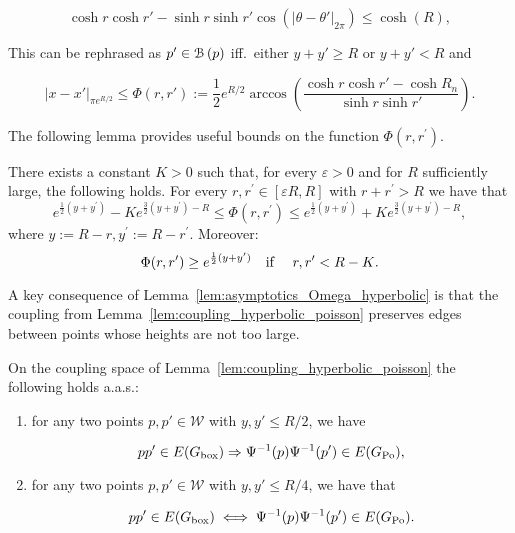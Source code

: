 $$
	\cosh r \cosh r' - \sinh r \sinh r'\cos\left( |\theta-\theta'|_{2\pi} \right) \le \cosh(R),
$$

\noindent
This can be rephrased as $p'\in {\mathcal B}\left(p\right)$ iff.~either $y+y'\geq R$ or $y+y'<R$ and 


\begin{equation}\label{eq:def_Omega_hyperbolic}
	|x-x'|_{\pi e^{R/2}} \leq \Phi(r,r') := \frac{1}{2}e^{R/2} \arccos\left( \frac{\cosh r \cosh r' - \cosh R_n}
	{\sinh r \sinh r'} \right).
\end{equation}

The following lemma provides useful bounds on the function $\Phi(r,r^\prime)$.

\begin{lemma}\label{lem:asymptotics_Omega_hyperbolic}
There exists a constant $K>0$ such that, for every $\varepsilon > 0$ and for $R$ sufficiently large, the following holds.
For every $r,r^\prime \in [\varepsilon R,R]$ with $r + r^\prime > R$ we have that 
\begin{equation}\label{eq:asymp1}
	e^{\frac{1}{2}(y+y^\prime)} - K e^{\frac{3}{2}(y+y^\prime) - R} \leq \Phi(r, r^\prime) 
	\leq  e^{\frac{1}{2}(y+y^\prime)} + K e^{\frac{3}{2}(y+y^\prime) - R},
\end{equation}
where $y := R - r, y^\prime := R - r^\prime$. 
Moreover:
\begin{equation}\label{eq:asymp2} 
\Phi(r,r^\prime) \geq e^{\frac12(y+y^\prime)} \quad \text{if \quad $r, r^\prime < R - K$.} 
\end{equation}
\end{lemma}

A key consequence of Lemma~\ref{lem:asymptotics_Omega_hyperbolic} is that the coupling from Lemma~\ref{lem:coupling_hyperbolic_poisson} 
preserves edges between points whose heights are not too large.  

\begin{lemma}\label{lem:coupling_edges}
On the coupling space of Lemma~\ref{lem:coupling_hyperbolic_poisson} the following holds a.a.s.:
\begin{enumerate}
\item for any two points $p, p' \in \mathcal{W}$ with $y, y'\le R/2$, we have 

$$pp' \in E(G_{\text{box}}) \Rightarrow \Psi^{-1}(p)\Psi^{-1}(p') \in E(G_{\text{Po}}), $$ 

\item for any two points $p, p' \in \mathcal{W}$ with $y, y' \le R/4$, we have that 

$$pp' \in E(G_{\text{box}}) \iff \Psi^{-1}(p)\Psi^{-1}(p') \in E(G_{\text{Po}}).$$

\end{enumerate}
\end{lemma}


